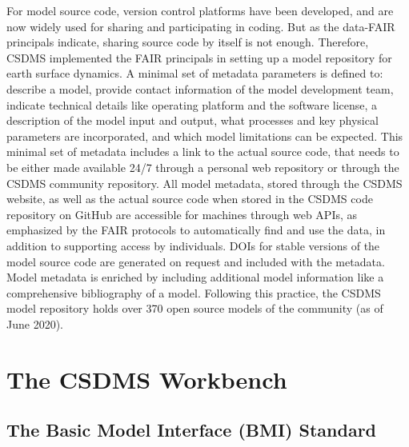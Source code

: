 \documentclass[12pt]{amsart}
\begin{document}
For model source code, version control platforms have been developed, and are now widely used for sharing and participating in coding. But as the data-FAIR principals indicate, sharing source code by itself is not enough. Therefore, CSDMS implemented the FAIR principals in setting up a model repository for earth surface dynamics. A minimal set of metadata parameters is defined to: describe a model, provide contact information of the model development team, indicate technical details like operating platform and the software license, a description of the model input and output, what processes and key physical parameters are incorporated, and which model limitations can be expected. This minimal set of metadata includes a link to the actual source code, that needs to be either made available 24/7 through a personal web repository or through the CSDMS community repository. All model metadata, stored through the CSDMS website, as well as the actual source code when stored in the CSDMS code repository on GitHub are accessible for machines through web APIs, as emphasized by the FAIR protocols to automatically find and use the data, in addition to supporting access by individuals. DOIs for stable versions of the model source code are generated on request and included with the metadata. Model metadata is enriched by including additional model information like a comprehensive bibliography of a model. Following this practice, the CSDMS model repository holds over 370 open source models of the community (as of June 2020). 


\section{The CSDMS Workbench}
\label{sec:workbench}

\subsection{The Basic Model Interface (BMI) Standard}



\end{document}
